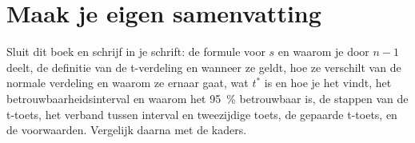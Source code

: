 
\begin{oefeningen}






\end{oefeningen}


\ifzelfstudie
\section*{Maak je eigen samenvatting}
Sluit dit boek en schrijf in je schrift: de formule voor $s$ en waarom je door $n - 1$ deelt, de definitie van de t-verdeling en wanneer ze geldt, hoe ze verschilt van de normale verdeling en waarom ze ernaar gaat, wat $t^*$ is en hoe je het vindt, het betrouwbaarheidsinterval en waarom het 95~\% betrouwbaar is, de stappen van de t-toets, het verband tussen interval en tweezijdige toets, de gepaarde t-toets, en de voorwaarden. Vergelijk daarna met de kaders.
\fi
